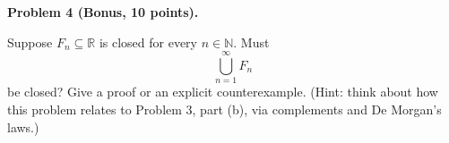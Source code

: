 \documentclass[11pt]{amsart}
\begin{document}
\bigskip

\noindent\textbf{Problem 4 (Bonus, 10 points).}

\noindent Suppose $F_n \subseteq \mathbb{R}$ is closed for every $n \in \mathbb{N}$. Must
\[
\bigcup_{n=1}^{\infty} F_n
\]
be closed? Give a proof or an explicit counterexample. (Hint: think about how this problem relates to Problem 3, part (b), via complements and De Morgan's laws.)
\end{document}
